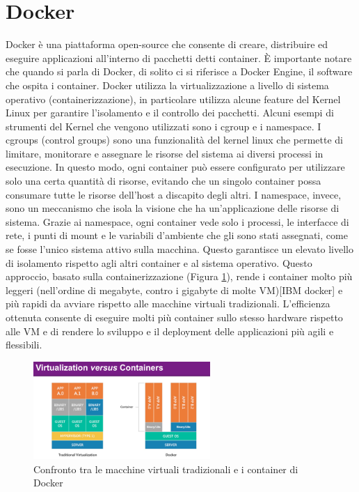 \section{Docker}
\label{sec:docker}
Docker è una piattaforma open-source che consente di creare, distribuire ed eseguire applicazioni all'interno di pacchetti detti container. È importante notare che quando si parla di Docker, di solito ci si riferisce a Docker Engine, il software che ospita i container. Docker utilizza la virtualizzazione a livello di sistema operativo (containerizzazione), in particolare utilizza alcune feature del Kernel Linux per garantire l’isolamento e il controllo dei pacchetti. Alcuni esempi di strumenti del Kernel che vengono utilizzati sono i cgroup e i namespace. I cgroups (control groups) sono una funzionalità del kernel linux che permette di limitare, monitorare e assegnare le risorse del sistema ai diversi processi in esecuzione. In questo modo, ogni container può essere configurato per utilizzare solo una certa quantità di risorse, evitando che un singolo container possa consumare tutte le risorse dell’host a discapito degli altri.
I namespace, invece, sono un meccanismo che isola la visione che ha un’applicazione delle risorse di sistema. Grazie ai namespace, ogni container vede solo i processi, le interfacce di rete, i punti di mount e le variabili d’ambiente che gli sono stati assegnati, come se fosse l'unico sistema attivo sulla macchina. Questo garantisce un elevato livello di isolamento rispetto agli altri container e al sistema operativo. Questo approccio, basato sulla containerizzazione (Figura \ref{fig:docker_containerization}), rende i container molto più leggeri (nell’ordine di megabyte, contro i gigabyte di molte VM)[IBM docker] e più rapidi da avviare rispetto alle macchine virtuali tradizionali. L’efficienza ottenuta consente di eseguire molti più container sullo stesso hardware rispetto alle VM e di rendere lo sviluppo e il deployment delle applicazioni più agili e flessibili.

\begin{figure}[h]
    \centering
    \includegraphics[width=0.6\textwidth]{img/contvsvirt.png}
    \caption{Confronto tra le macchine virtuali tradizionali e i container di Docker}
    \label{fig:docker_containerization}
\end{figure}


